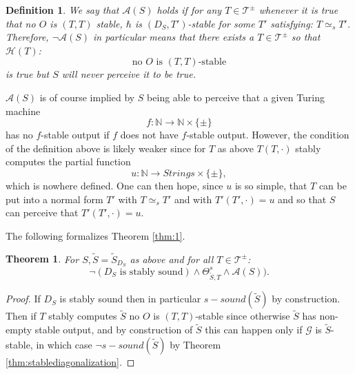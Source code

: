 \documentclass{amsart}  %
\numberwithin{equation}{section}
\newtheorem{theorem}[equation]{Theorem}
\newtheorem{definition}[equation]{Definition}
\theoremstyle{definition}
\theoremstyle{remark}
\begin{document}
{\begin{definition}
We say that $\mathcal{A} (S)$ holds if for any $T \in \mathcal{T} ^{\pm} $ whenever it is true that no $O$ is $(T,T)$ stable, $\hbar$ is $(D _{S},T')  $-stable for some $T'$ satisfying: $T \simeq _{s} T'  $.  Therefore, $\neg \mathcal{A} (S)$ in particular means that there exists a $T \in \mathcal{T} ^{\pm} $ so that $\mathcal{H} (T)$: \begin{equation*} \text{no $O$ is $(T,T)$-stable}
\end{equation*}
is true but $S$ will never perceive it to be true.
%
%
%
   \end{definition}
$\mathcal{A}(S)$ is of course implied by $S$ being able to perceive that a given Turing machine $$f: \mathbb{N} \to \mathbb{N} \times \{\pm\}$$ has no $f$-stable output if $f$ does not have $f$-stable output.
However, the condition of the definition above is likely weaker since for $T$ as above $T (T,\cdot)$ stably computes the partial function $$u: \mathbb{N} \to Strings \times \{\pm\},$$ which is nowhere defined. One can then hope, since $u$ is so simple, that $T$ can be put into a normal form $T'$ with $T \simeq _{s} T' $ and with $T' (T',\cdot) = u$ and so that $S$ can perceive that $T' (T',\cdot) = u$.

 The following formalizes Theorem \ref{thm:1}.
\begin{theorem} \label{thm:3} For $S,\widetilde{S} = \widetilde{S} _{D _{S} }   $ as above and for all $T \in \mathcal{T} ^{\pm} $: $$\neg (D _{S} \text{ is stably sound}) \land \Theta ^{s}  _{\widetilde{S},T} \land \mathcal{A} (S)).
$$ 
\end{theorem} 
\begin{proof} If $D _{S}$ is stably sound then in particular
$s-sound (\widetilde{S})$ by construction.
Then if $T$ stably computes $\widetilde{S} $ no $O$ is $(T,T)$-stable since otherwise $\widetilde{S} $ has non-empty stable output, and by construction of $\widetilde{S} $ this can happen only if $\mathcal{G}$ is $\widetilde{S} $-stable, in which case $\neg s-sound (\widetilde{S} )$ by Theorem \ref{thm:stablediagonalization}.  


\end{proof}}
\end{document}

